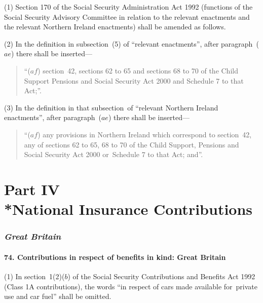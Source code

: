 \documentclass[12pt,a4paper]{article}
\begin{document}
(1) Section 170 of the Social Security Administration Act 1992 (functions of the Social Security Advisory Committee in relation to the relevant enactments and the relevant Northern Ireland enactments) shall be amended as follows.

(2) In the definition in subsection~(5)  of “relevant enactments”, after paragraph~($ae$)  there shall be inserted—
\begin{quotation}
“($af$) section~42, sections 62 to 65 and sections 68 to 70 of the Child Support Pensions and Social Security Act 2000 and Schedule 7 to that Act;”.
\end{quotation}

(3) In the definition in that subsection~of “relevant Northern Ireland enactments”, after paragraph~($ae$)  there shall be inserted—

\begin{quotation}
“($af$) any provisions in Northern Ireland which correspond to section~42, any of sections 62 to 65, 68 to 70 of the Child Support, Pensions and Social Security Act 2000 or~Schedule 7 to that Act; and”.
\end{quotation}


\part[Part IV --- National Insurance Contributions]{Part IV\\*National Insurance Contributions}

\renewcommand\parthead{--- Part IV}

\section{\itshape Great Britain}

\subsection{74. Contributions in respect of benefits in kind: Great Britain}

(1) In section~1(2)($b$)  of the Social Security Contributions and Benefits Act 1992 (Class 1A contributions), the words “in respect of cars made available for~private use and car fuel” shall be omitted.
\end{document}

